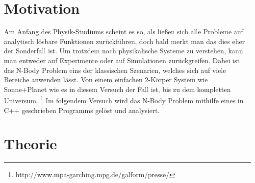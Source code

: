 \section{Motivation}
Am Anfang des Physik-Studiums scheint es so, als ließen
sich alle Probleme auf analytisch lösbare Funktionen zurückführen,
doch bald merkt man das dies eher der Sonderfall ist.
Um trotzdem noch physikalische Systeme zu verstehen, kann
man entweder auf Experimente oder auf Simulationen zurückgreifen.
Dabei ist das N-Body Problem eins der klassischen Szenarien, welches sich auf
viele Bereiche anwenden l\"asst. Von einem einfachen 2-Körper System wie Sonne+Planet
wie es in diesem Versuch der Fall ist, bis zu dem kompletten Universum.
\footnote{\label{foot:2}http://www.mpa-garching.mpg.de/galform/presse/}
\newline
Im folgendem Versuch wird das N-Body Problem mithilfe eines in C++
geschrieben Programms gelöst und analysiert.
\section{Theorie}
